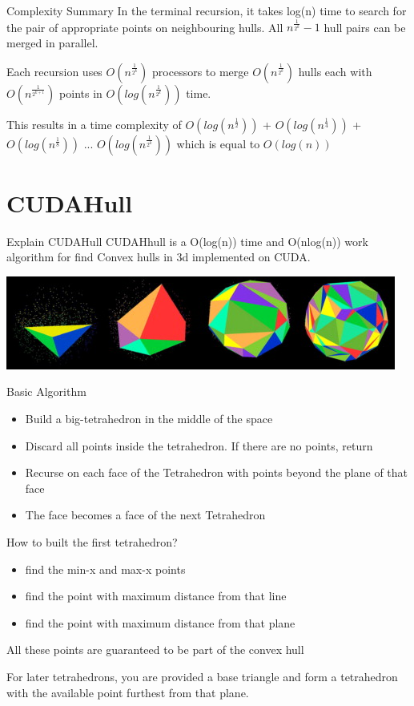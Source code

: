 \documentclass{beamer}
\begin{document}
\begin{frame}{Complexity Summary}
	In the terminal recursion, it takes log(n) time to search for the pair of appropriate points on neighbouring hulls. All $n^\frac{1}{2^k}-1$ hull pairs can be merged in parallel.
	
	Each recursion uses $O(n^\frac{1}{2^k})$ processors to merge $O(n^\frac{1}{2^k})$ hulls each with $O(n^\frac{1}{2^{k+1}})$ points in $O(log(n^\frac{1}{2^k}))$ time.
	
	This results in a time complexity of $O(log(n^\frac{1}{2}))$ + $O(log(n^\frac{1}{4}))$ + $O(log(n^\frac{1}{8}))$ ... $O(log(n^\frac{1}{2^k}))$ which is equal to $O(log(n))$

\end{frame}




\section{CUDAHull}

\begin{frame}{Explain CUDAHull}
CUDAHhull is a O(log(n)) time and O(nlog(n)) work algorithm for find Convex hulls in 3d implemented on CUDA.

\includegraphics[scale=1]{imgs/CUDAhull_example.jpg} 

\end{frame}

\begin{frame}{Basic Algorithm}
\begin{itemize}
\item Build a big-tetrahedron in the middle of the space
\item Discard all points inside the tetrahedron. If there are no points, return
\item Recurse on each face of the Tetrahedron with points beyond the plane of that face
\item The face becomes a face of the next Tetrahedron
\end{itemize}
\end{frame}


\begin{frame}{How to built the first tetrahedron?}
\begin{itemize}
\item find the min-x and max-x points
\item find the point with maximum distance from that line
\item find the point with maximum distance from that plane
\end{itemize}
All these points are guaranteed to be part of the convex hull


For later tetrahedrons, you are provided a base triangle and form a tetrahedron with the available point furthest from that plane.

\end{frame}
\end{document}
